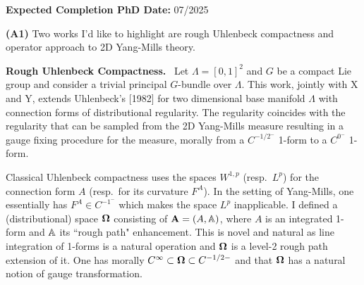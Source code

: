 \documentclass[./Research_statement.tex]{subfiles}
\begin{document}
\vspace*{-2cm}
\noindent \textbf{Expected Completion PhD Date:} 07/2025
\vspace{0.75cm}
\medskip 

\noindent \textbf{(A1)} Two works I’d like to highlight are rough Uhlenbeck compactness and operator approach to 2D Yang-Mills theory.

\vspace{2pt}

\noindent \textbf{Rough Uhlenbeck Compactness.}\ 
%
Let $\Lambda=[0,1]^2$ and $G$ be a compact Lie group and consider a trivial principal $G$-bundle over $\Lambda$.  
This work, jointly with X and Y, extends Uhlenbeck's [1982] for two dimensional base manifold $\Lambda$ with connection forms of distributional regularity. The regularity coincides with the regularity that can be sampled from the 2D Yang-Mills measure resulting in a gauge fixing procedure for the measure, morally from a $C^{-1/2^-}$ 1-form to a $C^{0^-}$ 1-form.  


Classical Uhlenbeck compactness uses the spaces $W^{1,p}$ (resp.\ $L^p$) for the connection form $A$ (resp.\ for its curvature $F^A$). In the setting of Yang-Mills, one essentially has $F^A\in C^{-1^-}$ which makes the space $L^p$ inapplicable. I defined a (distributional) space $\boldsymbol{\Omega}$ consisting of $\mathbf A=(A,\mathbb A)$, where $A$ is an integrated 1-form and  $\mathbb A$ its ``rough path" enhancement. 
%
%
This is novel and natural as line integration of 1-forms is a natural operation and $\boldsymbol{\Omega}$ is a level-2 rough path extension of it. 
%
One has morally $C^\infty\subset \boldsymbol{\Omega}\subset C^{-1/2-}$ and that $\boldsymbol{\Omega}$ has a natural notion of gauge transformation. 
\end{document}
